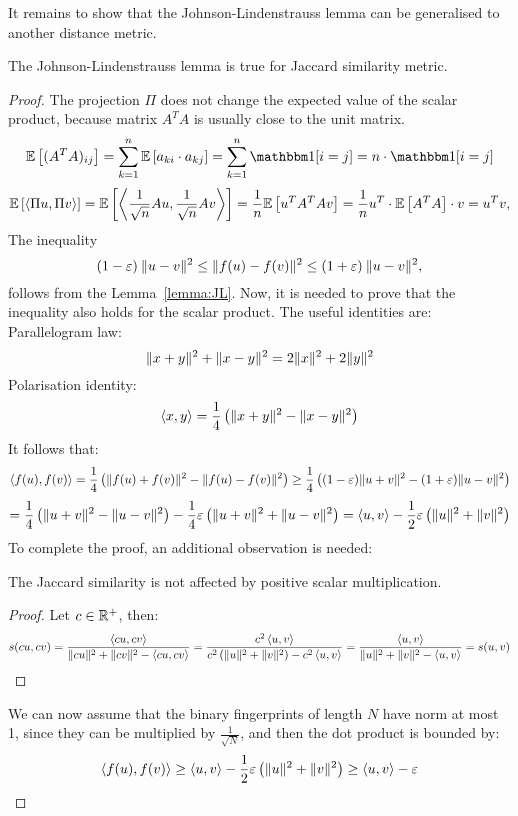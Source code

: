 It remains to show that the Johnson-Lindenstrauss lemma can be generalised to another distance metric.
\begin{propos}
    The Johnson-Lindenstrauss lemma is true for Jaccard similarity metric.
\end{propos}
\begin{proof}
The projection \( \Pi \) does not change the expected value of the scalar product, because matrix \( A^TA \) is usually close to the unit matrix.
\[
    \mathbb{E} \brackets{(A^TA)_{ij}} = \sum_{k=1}^{n} \mathbb{E} \brackets{a_{ki} \cdot a_{kj}} = \sum_{k=1}^{n} \one\!\brackets{i = j} = n \cdot \one\!\brackets{i = j}
\]
\[
    \mathbb{E}\left[ \left\langle \Pi u, \Pi v \right\rangle \right] = \mathbb{E}\left[ \left\langle \frac{1}{\sqrt{n}} Au, \frac{1}{\sqrt{n}} A v \right\rangle \right] = \frac{1}{n}\mathbb{E} \left[ u^TA^TAv \right] = \frac{1}{n} u^T \cdot \mathbb{E} \left[ A^TA \right] \cdot v = u^Tv,
\]
The inequality
\[
    (1-\varepsilon)\:\| u-v \|^2 \leq \| f(u)-f(v) \|^2 \leq (1+\varepsilon)\:\| u-v \|^2,
\]
follows from the Lemma~\ref{lemma:JL}. Now, it is needed to prove that the inequality also holds for the scalar product. The useful identities are: \\
Parallelogram law:
\[
    \| x+y \|^2 + \| x-y \|^2 = 2\| x \|^2 + 2\| y \|^2
\]
Polarisation identity:
\[
    \left\langle x, y \right\rangle = \frac{1}{4} \left( \| x+y \|^2 - \| x-y \|^2 \right)
\]
It follows that:
\[
    \left\langle f(u), f(v) \right\rangle = \frac{1}{4}\left( \| f(u)+f(v) \|^2 - \| f(u)-f(v) \|^2 \right) \geq \frac{1}{4}\left( (1-\varepsilon)\| u+v \|^2 - (1+\varepsilon)\| u-v \|^2 \right)
\]
\[
    = \frac{1}{4}\left( \| u+v \|^2 - \| u-v \|^2 \right) - \frac{1}{4}\varepsilon\left( \| u+v \|^2 + \| u-v \|^2 \right) = \left\langle u,v \right\rangle - \frac{1}{2}\varepsilon\left( \| u \|^2 + \| v \|^2 \right)
\]
To complete the proof, an additional observation is needed:
\begin{lemma}
    The Jaccard similarity is not affected by positive scalar multiplication.
\end{lemma}
\begin{proof}
    Let \( c \in \mathbb{R}^{+} \), then:
    \[
        s(cu, cv) = \frac{\left\langle cu, cv \right\rangle}{\| cu \|^2 + \| cv \|^2 - \left\langle cu, cv \right\rangle}  = \frac{c^2 \left\langle u, v \right\rangle}{c^2\left( \| u \|^2 + \| v \|^2 \right) - c^2 \left\langle u, v \right\rangle} = \frac{\left\langle u, v \right\rangle}{\| u \|^2 + \| v \|^2 - \left\langle u, v \right\rangle} = s(u, v)
    \]
\end{proof}
\noindent
We can now assume that the binary fingerprints of length \( N \) have norm at most 1, since they can be multiplied by \( \frac{1}{\sqrt{N}} \), and then the dot product is bounded by:
\[
    \left\langle f(u), f(v) \right\rangle \geq \left\langle u,v \right\rangle - \frac{1}{2}\varepsilon\left( \| u \|^2 + \| v \|^2 \right) \geq \left\langle u,v \right\rangle - \varepsilon
\]
\end{proof}
